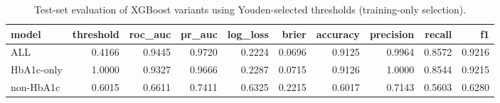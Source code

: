 \begin{table}[H]
\begin{center}
\begin{tabular}{lrrrrrrrrr}
\toprule
model & threshold & roc_auc & pr_auc & log_loss & brier & accuracy & precision & recall & f1 \\
\midrule
ALL & 0.4166 & 0.9445 & 0.9720 & 0.2224 & 0.0696 & 0.9125 & 0.9964 & 0.8572 & 0.9216 \\
HbA1c-only & 1.0000 & 0.9327 & 0.9666 & 0.2287 & 0.0715 & 0.9126 & 1.0000 & 0.8544 & 0.9215 \\
non-HbA1c & 0.6015 & 0.6611 & 0.7411 & 0.6325 & 0.2215 & 0.6017 & 0.7143 & 0.5603 & 0.6280 \\
\bottomrule
\end{tabular}
\end{center}
\vspace{-5pt}
\caption{Test-set evaluation of XGBoost variants using Youden-selected thresholds (training-only selection).}
\label{tab:xgb_test_eval_youden}
\end{table}
